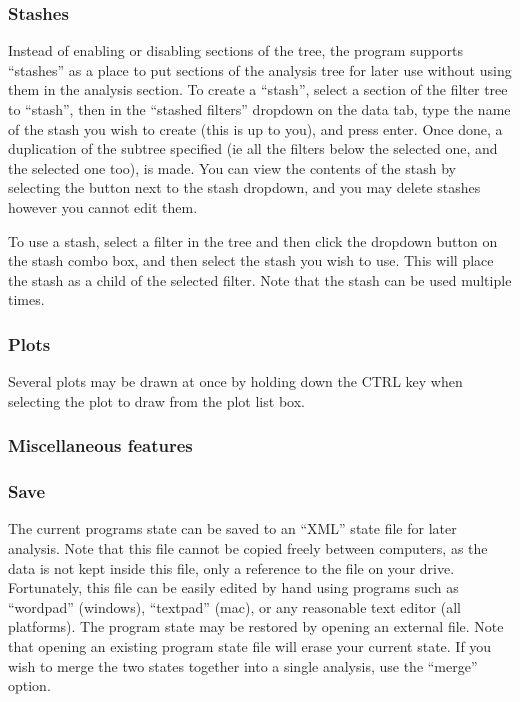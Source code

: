 \documentclass[10pt]{article}
\begin{document}
{\begin{itemize}
\end{itemize}

\subsubsection{Stashes}

Instead of enabling or disabling sections of the tree, the program supports ``stashes'' as a place to put sections of the analysis tree for later use without using them in the analysis section. To create a ``stash'', select a section of the filter tree to ``stash'', then in the ``stashed filters'' dropdown on the data tab, type the name of the stash you wish to create (this is up to you), and press enter. Once done, a duplication of the subtree specified (ie all the filters below the selected one, and the selected one too), is made. You can view the contents of the stash by selecting the button next to the stash dropdown, and you may delete stashes however you cannot edit them.  

To use a stash, select a filter in the tree and then click the dropdown button on the stash combo box, and then select the stash you wish to use. This will place the stash as a child of the selected filter. Note that the stash can be used multiple times.  

\subsubsection{Plots}
 Several plots may be drawn at once by holding down the CTRL key when selecting the plot to draw from the plot list box.  
\subsubsection{Miscellaneous features}
\subsubsection{Save}
 The current programs state can be saved to an ``XML'' state file for later analysis. Note that this file cannot be copied freely between computers, as the data is not kept inside this file, only a reference to the file on your drive. Fortunately, this file can be easily edited by hand using programs such as ``wordpad'' (windows), ``textpad'' (mac), or any reasonable text editor (all platforms).  
 The program state may be restored by opening an external file. Note that opening an existing program state file will erase your current state. If you wish to merge the two states together into a single analysis, use the ``merge'' option.  
}
\end{document}
